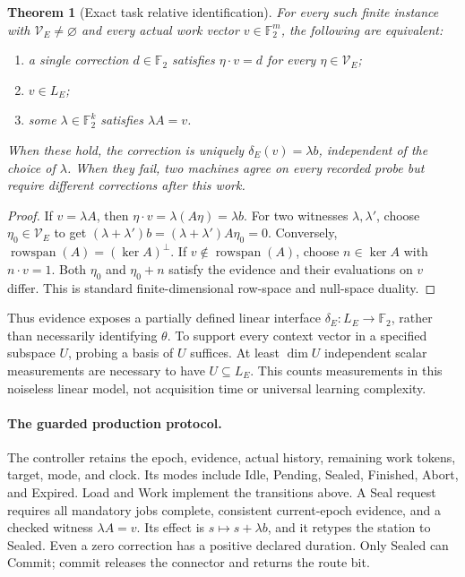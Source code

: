 \documentclass[11pt,a4paper]{article}
\newtheorem{theorem}{Theorem}[section]
\theoremstyle{definition}
\newcommand{\F}{\mathbb F_2}
\newcommand{\row}{\operatorname{rowspan}}
\newcommand{\kerA}{\operatorname{ker}}
\newcommand{\V}{\mathcal V}
\begin{document}
\begin{theorem}[Exact task relative identification]\label{thm:identify}
For every such finite instance with $\V_E\ne\varnothing$ and every actual
work vector $v\in\F^m$, the following are equivalent:
\begin{enumerate}[label=\textup{(\roman*)}]
\item a single correction $d\in\F$ satisfies $\eta\cdot v=d$ for every
$\eta\in\V_E$;
\item $v\in L_E$;
\item some $\lambda\in\F^k$ satisfies $\lambda A=v$.
\end{enumerate}
When these hold, the correction is uniquely $\delta_E(v)=\lambda b$,
independent of the choice of $\lambda$. When they fail, two machines agree
on every recorded probe but require different corrections after this work.
\end{theorem}
\begin{proof}
If $v=\lambda A$, then $\eta\cdot v=\lambda(A\eta)=\lambda b$.
For two witnesses $\lambda,\lambda'$, choose $\eta_0\in\V_E$ to get
$(\lambda+\lambda')b=(\lambda+\lambda')A\eta_0=0$.
Conversely, $\row(A)=(\kerA A)^\perp$. If $v\notin\row(A)$, choose
$n\in\kerA A$ with $n\cdot v=1$. Both $\eta_0$ and $\eta_0+n$ satisfy the
evidence and their evaluations on $v$ differ. This is standard
finite-dimensional row-space and null-space duality.
\end{proof}

Thus evidence exposes a partially defined linear interface
$\delta_E:L_E\to\F$, rather than necessarily identifying $\theta$.
To support every context vector in a specified subspace $U$, probing a
basis of $U$ suffices. At least $\dim U$ independent scalar measurements
are necessary to have $U\subseteq L_E$. This counts measurements in this
noiseless linear model, not acquisition time or universal learning complexity.

\paragraph{The guarded production protocol.}
The controller retains the epoch, evidence, actual history, remaining work
tokens, target, mode, and clock. Its modes include Idle, Pending, Sealed,
Finished, Abort, and Expired. Load and Work implement the transitions above. A
\textsf{Seal} request requires all mandatory jobs complete, consistent
current-epoch evidence, and a checked witness $\lambda A=v$. Its effect
is $s\mapsto s+\lambda b$, and it retypes the station to Sealed. Even a
zero correction has a positive declared duration. Only Sealed can
\textsf{Commit}; commit releases the connector and returns the route bit.
\end{document}
